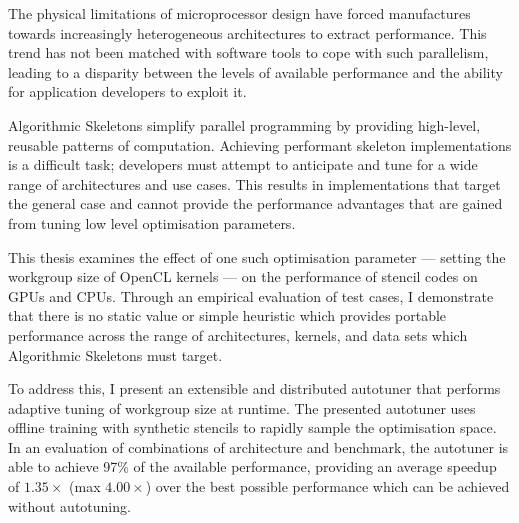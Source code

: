 The physical limitations of microprocessor design have forced
manufactures towards increasingly heterogeneous architectures to
extract performance. This trend has not been matched with software
tools to cope with such parallelism, leading to a disparity between
the levels of available performance and the ability for application
developers to exploit it.

Algorithmic Skeletons simplify parallel programming by providing
high-level, reusable patterns of computation. Achieving performant
skeleton implementations is a difficult task; developers must attempt
to anticipate and tune for a wide range of architectures and use
cases. This results in implementations that target the general case
and cannot provide the performance advantages that are gained from
tuning low level optimisation parameters.

This thesis examines the effect of one such optimisation parameter ---
setting the workgroup size of OpenCL kernels --- on the performance of
stencil codes on GPUs and CPUs. Through an empirical evaluation of
 test cases, I demonstrate that there is
no static value or simple heuristic which provides portable
performance across the range of architectures, kernels, and data sets
which Algorithmic Skeletons must target.

To address this, I present an extensible and distributed autotuner
that performs adaptive tuning of workgroup size at runtime. The
presented autotuner uses offline training with synthetic stencils to
rapidly sample the optimisation space. In an evaluation of
 combinations of architecture and benchmark,
the autotuner is able to achieve 97\% of the available performance,
providing an average speedup of $1.35\times$ (max $4.00\times$) over
the best possible performance which can be achieved without
autotuning.


